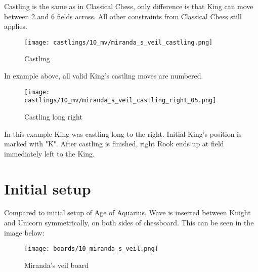 Castling is the same as in Classical Chess, only difference is that King can move between 2 and 6 fields across.
All other constraints from Classical Chess still applies.

\noindent
\begin{figure}[!h]
\texttt{[image: castlings/10\_mv/miranda\_s\_veil\_castling.png]}
\caption{Castling}
\label{fig:miranda_s_veil_castling}
\end{figure}

In example above, all valid King's castling moves are numbered.

\noindent
\begin{figure}[!h]
\texttt{[image: castlings/10\_mv/miranda\_s\_veil\_castling\_right\_05.png]}
\caption{Castling long right}
\label{fig:miranda_s_veil_castling_right_05}
\end{figure}

In this example King was castling long to the right. Initial King's position is marked with "K".
After castling is finished, right Rook ends up at field immediately left to the King.

\clearpage %

\section*{Initial setup}

Compared to initial setup of Age of Aquarius, Wave is inserted between Knight and Unicorn
symmetrically, on both sides of chessboard. This can be seen in the image below:

\noindent
\begin{figure}[h]
\texttt{[image: boards/10\_miranda\_s\_veil.png]}
\caption{Miranda's veil board}
\label{fig:10_miranda_s_veil}
\end{figure}

\clearpage %
